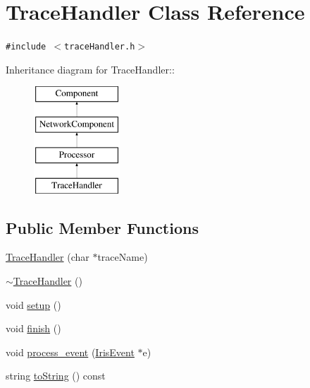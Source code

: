 \hypertarget{classTraceHandler}{
\section{TraceHandler Class Reference}
\label{classTraceHandler}
}
{\tt \#include $<$traceHandler.h$>$}

Inheritance diagram for TraceHandler::\begin{figure}[H]
\begin{center}
\leavevmode
\includegraphics[height=4cm]{classTraceHandler}
\end{center}
\end{figure}
\subsection*{Public Member Functions}
\begin{CompactItemize}
\item 
\hyperlink{classTraceHandler_4aa3f9f12e40d05263ab1d973824bae1}{TraceHandler} (char $\ast$traceName)
\item 
\hyperlink{classTraceHandler_491147a0c061c2c3540e8e0e829602fe}{$\sim$TraceHandler} ()
\item 
void \hyperlink{classTraceHandler_9311bd94c5ad0a6e354d2a0bd8b8699a}{setup} ()
\item 
void \hyperlink{classTraceHandler_0a0d8b0c9301bba86fc115cb6f3ebfc8}{finish} ()
\item 
void \hyperlink{classTraceHandler_ce34c9fd6ca6893af23d1167348ee0c9}{process\_\-event} (\hyperlink{classIrisEvent}{IrisEvent} $\ast$e)
\item 
string \hyperlink{classTraceHandler_e2a56abded1637aba10677483fee4e32}{toString} () const 
\end{CompactItemize}

